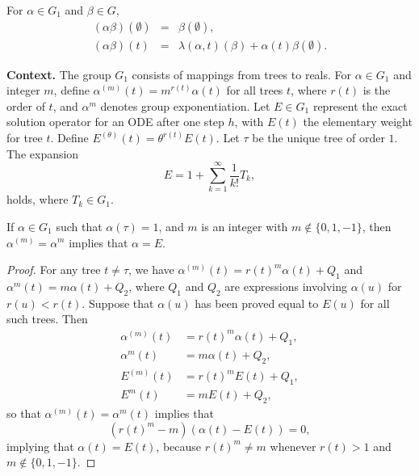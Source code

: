 \begin{theorem}
\begin{theorem}

  \label{thm:386A}
For $\alpha \in G_1$ and $\beta \in G$,
\[
\begin{array}{rcl}
(\alpha\beta)(\emptyset) & = & \beta(\emptyset), \\
(\alpha\beta)(t) & = & \lambda(\alpha, t)(\beta) + \alpha(t)\beta(\emptyset).
\end{array}
\]
\end{theorem}

\noindent\textbf{Context.}
The group $G_1$ consists of mappings from trees to reals. For $\alpha\in G_1$ and integer $m$, define $\alpha^{(m)}(t)=m^{r(t)}\alpha(t)$ for all trees $t$, where $r(t)$ is the order of $t$, and $\alpha^m$ denotes group exponentiation. Let $E\in G_1$ represent the exact solution operator for an ODE after one step $h$, with $E(t)$ the elementary weight for tree $t$. Define $E^{(\theta)}(t)=\theta^{r(t)}E(t)$. Let $\tau$ be the unique tree of order $1$. The expansion
\begin{equation}
E = 1 + \sum_{k=1}^{\infty} \frac{1}{k!} T_k,
\end{equation}
holds, where $T_k\in G_1$.

\begin{theorem}

  \label{thm:387A}
If $\alpha \in G_1$ such that $\alpha(\tau) = 1$, and $m$ is an integer with $m \notin \{0, 1, -1\}$, then $\alpha^{(m)} = \alpha^m$ implies that $\alpha = E$.
\end{theorem}

\begin{proof}
For any tree $t \neq \tau$, we have $\alpha^{(m)}(t) = r(t)^m \alpha(t) + Q_1$ and $\alpha^m(t) = m\alpha(t) + Q_2$, where $Q_1$ and $Q_2$ are expressions involving $\alpha(u)$ for $r(u) < r(t)$. Suppose that $\alpha(u)$ has been proved equal to $E(u)$ for all such trees. Then
\begin{align*}
\alpha^{(m)}(t) &= r(t)^m \alpha(t) + Q_1, \\
\alpha^m(t) &= m\alpha(t) + Q_2, \\
E^{(m)}(t) &= r(t)^m E(t) + Q_1, \\
E^m(t) &= mE(t) + Q_2,
\end{align*}
so that $\alpha^{(m)}(t) = \alpha^m(t)$ implies that
\[
(r(t)^m - m)(\alpha(t) - E(t)) = 0,
\]
implying that $\alpha(t) = E(t)$, because $r(t)^m \neq m$ whenever $r(t) > 1$ and $m \notin \{0, 1, -1\}$.


\end{proof}
\end{theorem}
